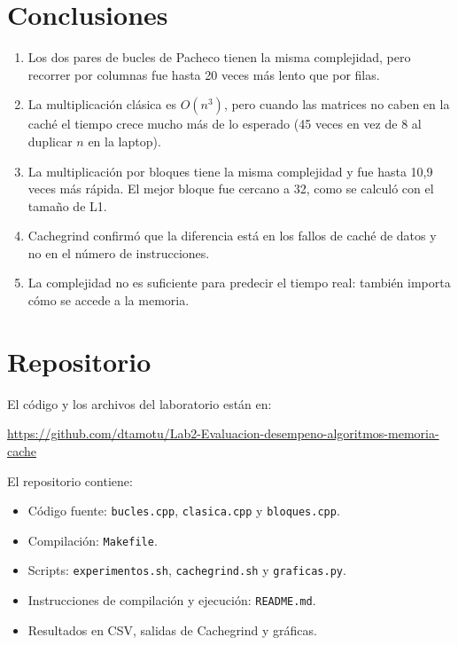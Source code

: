 \documentclass[11pt]{article}
\begin{document}
\section{Conclusiones}

\begin{enumerate}
\item Los dos pares de bucles de Pacheco tienen la misma complejidad, pero
      recorrer por columnas fue hasta 20 veces más lento que por filas.
\item La multiplicación clásica es $O(n^3)$, pero cuando las matrices no caben
      en la caché el tiempo crece mucho más de lo esperado (45 veces en vez de
      8 al duplicar $n$ en la laptop).
\item La multiplicación por bloques tiene la misma complejidad y fue hasta 10,9
      veces más rápida. El mejor bloque fue cercano a 32, como se calculó con
      el tamaño de L1.
\item Cachegrind confirmó que la diferencia está en los fallos de caché de
      datos y no en el número de instrucciones.
\item La complejidad no es suficiente para predecir el tiempo real: también
      importa cómo se accede a la memoria.
\end{enumerate}

\section{Repositorio}

El código y los archivos del laboratorio están en:

\begin{center}
\url{https://github.com/dtamotu/Lab2-Evaluacion-desempeno-algoritmos-memoria-cache}
\end{center}

El repositorio contiene:
\begin{itemize}
\item Código fuente: \texttt{bucles.cpp}, \texttt{clasica.cpp} y \texttt{bloques.cpp}.
\item Compilación: \texttt{Makefile}.
\item Scripts: \texttt{experimentos.sh}, \texttt{cachegrind.sh} y \texttt{graficas.py}.
\item Instrucciones de compilación y ejecución: \texttt{README.md}.
\item Resultados en CSV, salidas de Cachegrind y gráficas.
\end{itemize}
\end{document}
